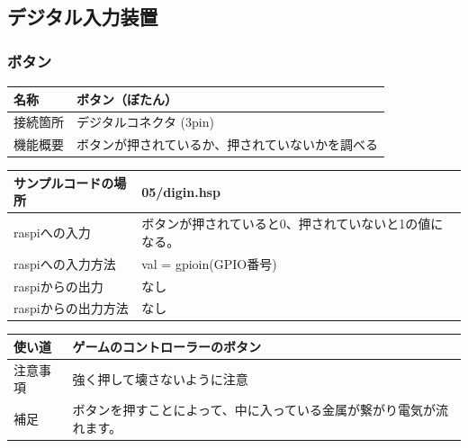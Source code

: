 \subsection{デジタル入力装置}
\subsubsection{ボタン}\label{button}
\begin{table}[H]
	\begin{tabular}{|p{\colF}|p{\colG}|}	\hline
	名称 & ボタン（ぼたん）\\ \hline
	接続箇所 & デジタルコネクタ (3pin)\\ \hline
	機能概要 & ボタンが押されているか、押されていないかを調べる\\ \hline
  \end{tabular}
\end{table}

\begin{table}[H]
	\begin{tabular}{|p{\colF}|p{\colG}|}	\hline
	サンプルコードの場所 & 05/digin.hsp\\ \hline
	raspiへの入力 & ボタンが押されていると0、押されていないと1の値になる。\\ \hline
	raspiへの入力方法 & val = gpioin(GPIO番号)\\ \hline
	raspiからの出力 & なし\\ \hline
	raspiからの出力方法 & なし\\ \hline
  \end{tabular}
\end{table}

\begin{table}[H]
	\begin{tabular}{|p{\colF}|p{\colG}|} \hline
	使い道 & ゲームのコントローラーのボタン\\ \hline
	注意事項 & 強く押して壊さないように注意\\ \hline
	補足 & ボタンを押すことによって、中に入っている金属が繋がり電気が流れます。\\ \hline
  \end{tabular}
\end{table}


